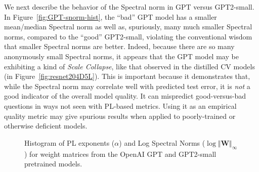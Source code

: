 We next describe the behavior of the Spectral norm in GPT versus GPT2-small.
In Figure~\ref{fig:GPT-snorm-hist}, the ``bad'' GPT model has a smaller mean/median Spectral norm as well as, spuriously, many much smaller Spectral norms, compared to the ``good'' GPT2-small, violating the conventional wisdom that smaller Spectral norms are better.
Indeed, because there are so many anonymously small Spectral norms, it appears that the GPT model may be exhibiting a kind of \emph{Scale Collapse}, like that observed in the distilled CV models (in Figure~\ref{fig:resnet204D5L}).
This is important because it demonstrates that, while the Spectral norm may correlate well with predicted test error, it is \emph{not} a good indicator of the overall model quality.
It can mispredict good-versus-bad questions in ways not seen with PL-based metrics.
Using it as an empirical quality metric may give spurious results when applied to poorly-trained or otherwise deficient models. 

\begin{figure}[h]
    \centering
    \qquad
   \caption{Histogram of PL exponents ($\alpha$) and Log Spectral Norms ($\log\Vert\mathbf{W}\Vert_{\infty}$) for weight matrices from the OpenAI GPT and GPT2-small pretrained models.}
   
\label{fig:GPT-hist}
\end{figure}


